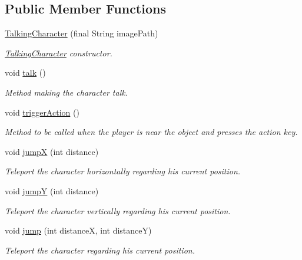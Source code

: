 \subsection*{Public Member Functions}
\begin{DoxyCompactItemize}
\item 
\hyperlink{classworld_1_1character_1_1_talking_character_afb0031b1a74ecc52e568ba319384853c}{Talking\-Character} (final String image\-Path)
\begin{DoxyCompactList}\small\item\em \hyperlink{classworld_1_1character_1_1_talking_character}{Talking\-Character} constructor. \end{DoxyCompactList}\item 
void \hyperlink{classworld_1_1character_1_1_talking_character_ac38a9c3d5a62edc8e8ae776410c834af}{talk} ()
\begin{DoxyCompactList}\small\item\em Method making the character talk. \end{DoxyCompactList}\item 
void \hyperlink{classworld_1_1character_1_1_talking_character_a880e0de97bfae094b3d25a12c055cad2}{trigger\-Action} ()
\begin{DoxyCompactList}\small\item\em Method to be called when the player is near the object and presses the action key. \end{DoxyCompactList}\item 
void \hyperlink{classworld_1_1character_1_1_character_a1c4f59dee601acfb4cf3ec000a87e142}{jump\-X} (int distance)
\begin{DoxyCompactList}\small\item\em Teleport the character horizontally regarding his current position. \end{DoxyCompactList}\item 
void \hyperlink{classworld_1_1character_1_1_character_aaddaea7c1175b19f80c0a10b87b59d75}{jump\-Y} (int distance)
\begin{DoxyCompactList}\small\item\em Teleport the character vertically regarding his current position. \end{DoxyCompactList}\item 
void \hyperlink{classworld_1_1character_1_1_character_a38da898f19b8ac87049552edb20a70c8}{jump} (int distance\-X, int distance\-Y)
\begin{DoxyCompactList}\small\item\em Teleport the character regarding his current position. \end{DoxyCompactList}\item 

\end{DoxyCompactItemize}
